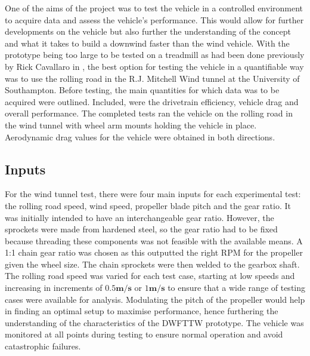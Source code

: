 One of the aims of the project was to test the vehicle in a controlled environment to acquire data and assess the vehicle’s performance. This would allow for further developments on the vehicle but also further the understanding of the concept and what it takes to build a downwind faster than the wind vehicle. With the prototype being too large to be tested on a treadmill as had been done previously by Rick Cavallaro in \cite{rick2008youtube}, the best option for testing the vehicle in a quantifiable way was to use the rolling road in the R.J. Mitchell Wind tunnel at the University of Southampton. Before testing, the main quantities for which data was to be acquired were outlined. Included, were the drivetrain efficiency, vehicle drag and overall performance. The completed tests ran the vehicle on the rolling road in the wind tunnel with wheel arm mounts holding the vehicle in place. Aerodynamic drag values for the vehicle were obtained in both directions.

\subsection{Inputs} 

For the wind tunnel test, there were four main inputs for each experimental test: the rolling road speed, wind speed, propeller blade pitch and the gear ratio. It was initially intended to have an interchangeable gear ratio. However, the sprockets were made from hardened steel, so the gear ratio had to be fixed because threading these components was not feasible with the available means. A 1:1 chain gear ratio was chosen as this outputted the right RPM for the propeller given the wheel size. The chain sprockets were then welded to the gearbox shaft. The rolling road speed was varied for each test case, starting at low speeds and increasing in increments of $0.5\mathbf{m/s}$ or $1\mathbf{m/s}$ to ensure that a wide range of testing cases were available for analysis. Modulating the pitch of the propeller would help in finding an optimal setup to maximise performance, hence furthering the understanding of the characteristics of the DWFTTW prototype. The vehicle was monitored at all points during testing to ensure normal operation and avoid catastrophic failures.

